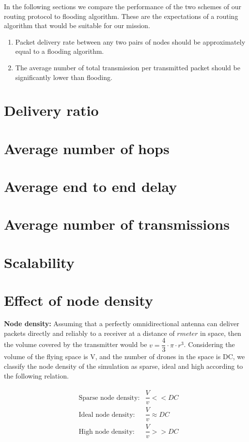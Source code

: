 In the following sections we compare the performance of the two schemes of our routing protocol to flooding algorithm. These are the expectations of a routing algorithm that would be suitable for our mission. 
\begin{enumerate}
\item Packet delivery rate between any two pairs of nodes should be approximately equal to a flooding algorithm. 
\item The average number of total transmission per transmitted packet should be significantly lower than flooding.
\end{enumerate}
 
\section{Delivery ratio}
\section{Average number of hops}
\section{Average end to end delay}
\section{Average number of transmissions}
\section{Scalability}
\section{Effect of node density}

\textbf{Node density:} Assuming that a perfectly omnidirectional antenna can deliver packets directly and reliably to a receiver at a distance of $ r meter$  in space, then the volume covered by the transmitter would be $ v = \dfrac{4}{3} \cdot \pi \cdot r^3 $. Considering the volume of the flying space is V, and the number of drones in the space is DC, we classify the node density of the simulation as sparse, ideal and high according to the following relation.

\begin{eqnarray} \label{node_density}
\begin{aligned}
& \text{Sparse node density:} & \dfrac{V}{v} << DC \\
& \text{Ideal node density:} & \dfrac{V}{v} \approx DC \\
& \text{High node density:} & \dfrac{V}{v} >> DC
\end{aligned}
\end{eqnarray}

